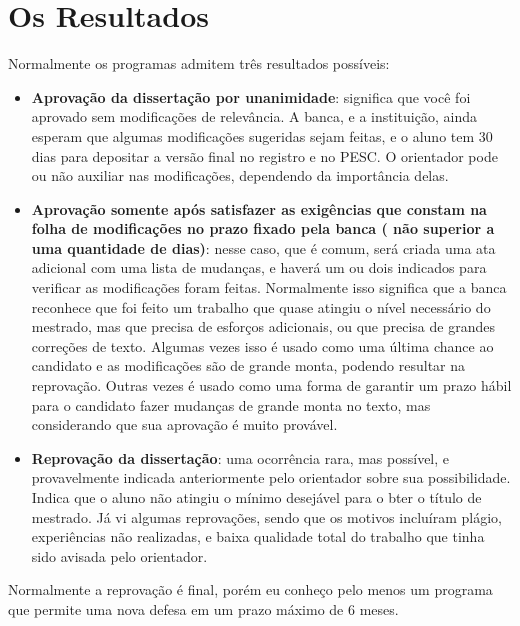 \section{Os Resultados}

Normalmente os programas admitem três resultados possíveis:
\begin{itemize}
    \item \textbf{Aprovação da dissertação por unanimidade}: significa que você foi aprovado sem modificações de relevância. A banca, e a instituição, ainda esperam que algumas modificações sugeridas sejam feitas, e o aluno tem 30 dias para depositar a versão final no registro e no PESC. O orientador pode ou não auxiliar nas modificações, dependendo da importância delas.
    \item \textbf{Aprovação  somente  após  satisfazer  as  exigências que constam 	 na  folha  de   modificações  no  prazo   fixado  pela  banca    ( não superior  a   uma quantidade de  dias)}: nesse caso, que é comum, será criada uma ata adicional com uma lista de mudanças, e haverá um ou dois indicados para verificar as modificações foram feitas. Normalmente isso significa que a banca reconhece que foi feito um trabalho que quase atingiu o nível necessário do mestrado, mas que precisa de esforços adicionais, ou que precisa de grandes correções de texto. Algumas vezes isso é usado como uma última chance ao candidato e as modificações são de grande monta, podendo resultar na reprovação. Outras vezes é usado como uma forma de garantir um prazo hábil para o candidato fazer mudanças de grande monta no texto, mas considerando que sua aprovação é muito provável.
    \item \textbf{Reprovação da dissertação}: uma ocorrência rara, mas possível, e provavelmente indicada anteriormente pelo orientador sobre sua possibilidade. Indica que o aluno não atingiu o mínimo desejável para o bter o título de mestrado. Já vi algumas reprovações, sendo que os motivos incluíram plágio, experiências não realizadas, e baixa qualidade total do trabalho que tinha sido avisada pelo orientador.
\end{itemize}

Normalmente a reprovação é final, porém eu conheço pelo menos um programa que permite uma nova defesa em um prazo máximo de 6 meses.


